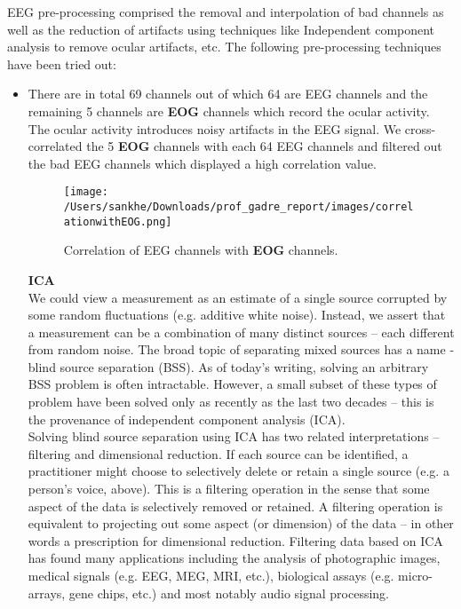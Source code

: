 EEG pre-processing comprised the removal and interpolation of bad channels as well as the reduction of artifacts using techniques like Independent component analysis to remove ocular artifacts, etc.
The following pre-processing techniques have been tried out:
\begin{itemize}
  \item There are in total 69 channels out of which 64 are EEG channels and the remaining 5 channels are \textbf{EOG} channels which record the ocular activity. The ocular activity introduces noisy artifacts in the EEG signal. We cross-correlated the 5 \textbf{EOG} channels with each 64 EEG channels and filtered out the bad EEG channels which displayed a high correlation value.

  \begin{figure}[h!]
	\texttt{[image: /Users/sankhe/Downloads/prof\_gadre\_report/images/correlationwithEOG.png]}
	\caption{Correlation of EEG channels with \textbf{EOG} channels.}
	\label{fig:result1}
  \end{figure}

\textbf{ICA}\\ 
We could view a measurement as an estimate of a single source corrupted by some random fluctuations (e.g.  additive white noise). Instead, we assert that a measurement can be a combination of many distinct sources – each different from random noise. The broad topic of separating mixed sources has a name -blind source separation (BSS). As of today’s writing, solving an arbitrary BSS problem is often intractable. However, a small subset of these types of problem have been solved only as recently as the last two decades – this is the provenance of independent component analysis (ICA). \\

Solving blind source separation using ICA has two related interpretations – filtering and dimensional reduction. If each source can be identified, a practitioner might choose to selectively delete or retain a single source (e.g. a person’s voice, above).   This is  a filtering operation in the sense that some aspect of the data is selectively removed or retained. A filtering operation is equivalent to projecting out some aspect (or dimension) of the data – in other words a prescription for dimensional reduction. Filtering data based on ICA has found many applications including the analysis of photographic images, medical signals (e.g. EEG, MEG, MRI, etc.), biological assays (e.g. micro-arrays, gene chips, etc.) and most notably audio signal processing. \\ 


\end{itemize}
